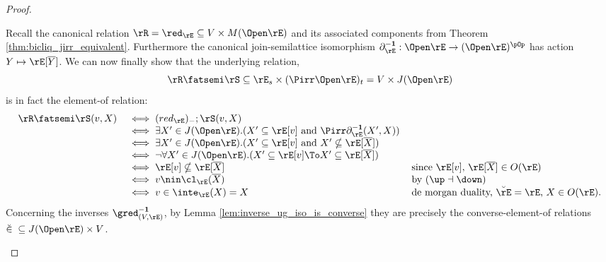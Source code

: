 \documentclass{article}
\begin{document}
\begin{proof}
\begin{enumerate}
\[\]
Recall the canonical relation $\rR = \red_\rE \subseteq V \times M(\Open\rE)$ and its associated components from Theorem \ref{thm:bicliq_jirr_equivalent}. Furthermore the canonical join-semilattice isomorphism $\partial_\rE^{\bf-1} : \Open\rE \to (\Open\rE)^{\pOp}$ has action $Y \mapsto \rE[\overline{Y}]$. We can now finally show that the underlying relation,
\[
\rR \fatsemi \rS 
\subseteq \rE_s \times (\Pirr\Open\rE)_t
= V \times J(\Open\rE)
\]
is in fact the element-of relation:
\[
\begin{tabular}{lll}
$\rR \fatsemi \rS(v,X)$
&
$\iff (red_\rE)_- ; \rS(v,X)$
\\&
$\iff \exists X' \in J(\Open\rE).( X' \subseteq \rE[v] \text{ and } \Pirr\partial_\rE^{\bf-1}(X',X))$
\\&
$\iff \exists X' \in J(\Open\rE).( X' \subseteq \rE[v] \text{ and } X' \nsubseteq \rE[\overline{X}] )$
\\&
$\iff \neg\forall X' \in J(\Open\rE).( X' \subseteq \rE[v] \To X' \subseteq \rE[\overline{X}] )$
\\&
$\iff \rE[v] \nsubseteq \rE[\overline{X}]$
& since $\rE[v], \, \rE[\overline{X}] \in O(\rE)$
\\&
$\iff v \nin \cl_\rE(\overline{X})$
& by $(\up\dashv\down)$
\\&
$\iff v \in \inte_\rE(X) = X$
& de morgan duality, $\breve{\rE} = \rE$, $X \in O(\rE)$.
\end{tabular}
\]
Concerning the inverses $\gred_{(V,\rE)}^{\bf-1}$, by Lemma \ref{lem:inverse_ug_iso_is_converse} they are precisely the converse-element-of relations $\breve{\in} \; \subseteq J(\Open\rE) \times V$.


\end{enumerate}
\end{proof}
\end{document}
